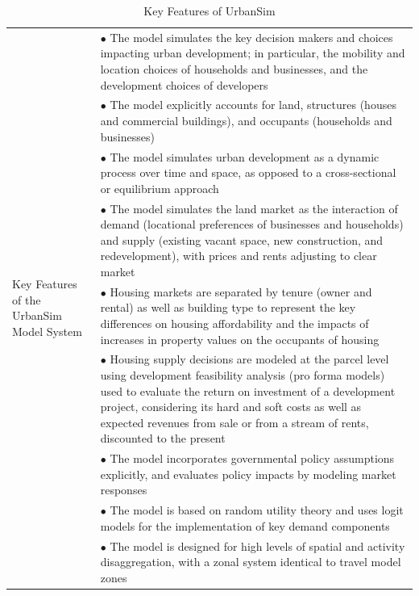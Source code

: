 \begin{table}[htp]
\caption{Key Features of UrbanSim}
\label{tab:key-features}
\begin{center}
\begin{tabular}{ p{1.5in}  p{4.4in}  }
\toprule[1.5pt]
\multirow[c]{10}{1.5in}{Key Features of the UrbanSim
Model System} &  $\bullet$   The model simulates the key decision makers and
choices impacting urban development; in particular, the mobility and
location choices of households and businesses, and the development
choices of developers\\
&  $\bullet$   The model explicitly accounts for land, structures (houses and commercial buildings), and occupants (households and businesses)\\
&  $\bullet$   The model simulates urban development as a dynamic process over time and space, as opposed to a cross-sectional or equilibrium approach\\
&  $\bullet$   The model simulates the land market as the interaction of demand (locational preferences of businesses and households) and supply (existing vacant space, new construction, and redevelopment), with prices and rents adjusting to clear market\\
&  $\bullet$   Housing markets are separated by tenure (owner and rental) as well as building type to represent the key differences on housing affordability and the impacts of increases in property values on the occupants of housing\\
&  $\bullet$   Housing supply decisions are modeled at the parcel level using development feasibility analysis (pro forma models) used to evaluate the return on investment of a development project, considering its hard and soft costs as well as expected revenues from sale or from a stream of rents, discounted to the present\\
& $\bullet$    The model incorporates governmental policy assumptions explicitly, and evaluates policy impacts by modeling market responses\\
& $\bullet$    The model is based on random utility theory and uses logit models for the implementation of key demand components\\
& $\bullet$    The model is designed for high levels of spatial and activity disaggregation, with a zonal system identical to travel model zones\\

\end{tabular}
\end{center}
\end{table}

